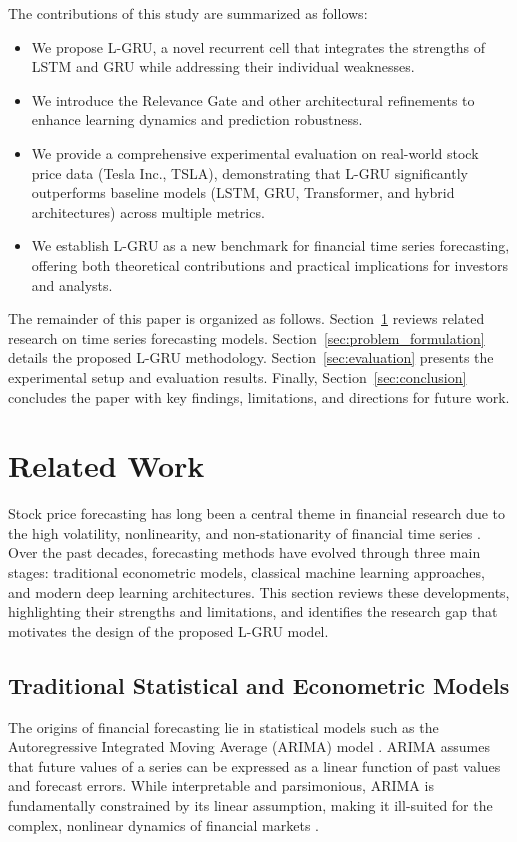\documentclass{cys}
\begin{document}
The contributions of this study are summarized as follows:
\begin{itemize}
    \item We propose L-GRU, a novel recurrent cell that integrates the strengths of LSTM and GRU while addressing their individual weaknesses.
    \item We introduce the Relevance Gate and other architectural refinements to enhance learning dynamics and prediction robustness.
    \item We provide a comprehensive experimental evaluation on real-world stock price data (Tesla Inc., TSLA), demonstrating that L-GRU significantly outperforms baseline models (LSTM, GRU, Transformer, and hybrid architectures) across multiple metrics.
    \item We establish L-GRU as a new benchmark for financial time series forecasting, offering both theoretical contributions and practical implications for investors and analysts.
\end{itemize}

The remainder of this paper is organized as follows. Section~\ref{sec:related_work} reviews related research on time series forecasting models. Section~\ref{sec:problem_formulation} details the proposed L-GRU methodology. Section~\ref{sec:evaluation} presents the experimental setup and evaluation results. Finally, Section~\ref{sec:conclusion} concludes the paper with key findings, limitations, and directions for future work.



\section{Related Work}\label{sec:related_work}

Stock price forecasting has long been a central theme in financial research due to the high volatility, nonlinearity, and non-stationarity of financial time series \cite{refenes1994stock}. Over the past decades, forecasting methods have evolved through three main stages: traditional econometric models, classical machine learning approaches, and modern deep learning architectures. This section reviews these developments, highlighting their strengths and limitations, and identifies the research gap that motivates the design of the proposed L-GRU model.

\subsection{Traditional Statistical and Econometric Models}
The origins of financial forecasting lie in statistical models such as the Autoregressive Integrated Moving Average (ARIMA) model \cite{box2015time}. ARIMA assumes that future values of a series can be expressed as a linear function of past values and forecast errors. While interpretable and parsimonious, ARIMA is fundamentally constrained by its linear assumption, making it ill-suited for the complex, nonlinear dynamics of financial markets \cite{makridakis2000m3}.
\end{document}
